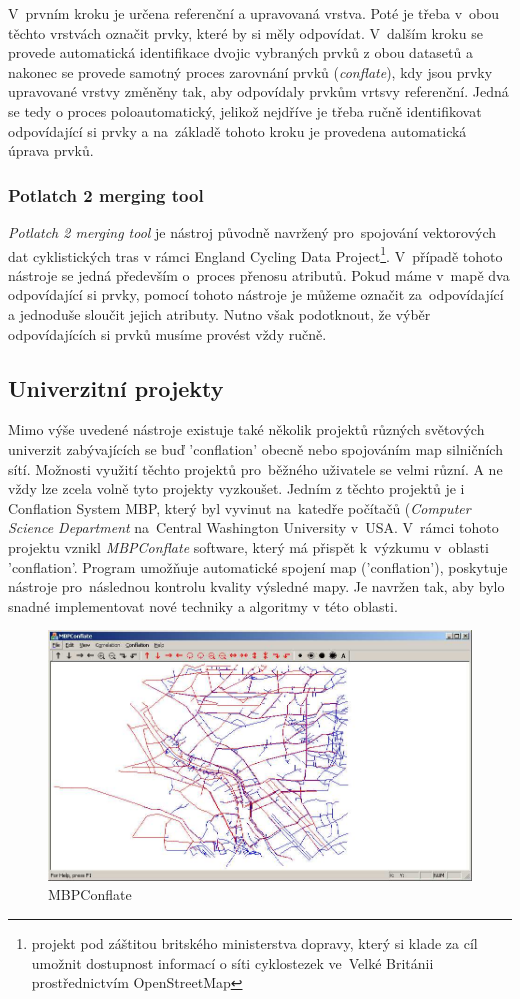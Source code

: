 V~prvním kroku je určena referenční a upravovaná vrstva. Poté je třeba v~obou těchto vrstvách označit prvky, které by si měly odpovídat. V~dalším kroku se provede automatická
identifikace dvojic vybraných prvků z obou datasetů a nakonec se provede samotný proces zarovnání prvků (\textit{conflate}), kdy jsou prvky upravované vrstvy změněny tak, 
aby odpovídaly prvkům vrtsvy referenční. Jedná se tedy o proces poloautomatický, jelikož nejdříve je třeba ručně identifikovat odpovídající si prvky a na~základě tohoto kroku 
je provedena automatická úprava prvků.



\subsubsection{Potlatch 2 merging tool}

\textit{Potlatch 2 merging tool} je nástroj původně navržený pro~spojování vektorových dat cyklistických tras v rámci England Cycling Data Project\footnote{projekt pod záštitou
britského ministerstva dopravy, který si klade za cíl umožnit dostupnost informací o síti cyklostezek  ve~Velké Británii prostřednictvím OpenStreetMap}. %
V~případě tohoto nástroje se jedná především o~proces přenosu atributů. Pokud máme v~mapě dva odpovídající si prvky, pomocí tohoto nástroje je můžeme označit za~odpovídající
a jednoduše sloučit jejich atributy. Nutno však podotknout, že výběr odpovídajících si prvků musíme provést vždy ručně. 


\subsection{Univerzitní projekty}

Mimo výše uvedené nástroje existuje také několik projektů různých světových univerzit zabývajících se buď 'conflation' obecně nebo spojováním map silničních sítí. Možnosti
využití těchto projektů pro~běžného uživatele se velmi různí. A ne vždy lze zcela volně tyto projekty vyzkoušet. Jedním z těchto projektů je i Conflation System MBP, který
byl vyvinut na~katedře počítačů (\textit{Computer Science Department} na~Central Washington University v~USA. V~rámci tohoto projektu vznikl \textit{MBPConflate} software,
který má přispět k~výzkumu v~oblasti 'conflation'. Program umožňuje automatické spojení map ('conflation'), poskytuje nástroje pro~následnou kontrolu kvality výsledné mapy.
Je navržen tak, aby bylo snadné implementovat nové techniky a algoritmy v této oblasti.  

\label{mbppic}
  \begin{figure}[hbt]
    \centering
      \includegraphics[width=350pt]{./pictures/MBPconflate.png}
      \caption{MBPConflate}
      \label{fig:mbp}
  \end{figure}
